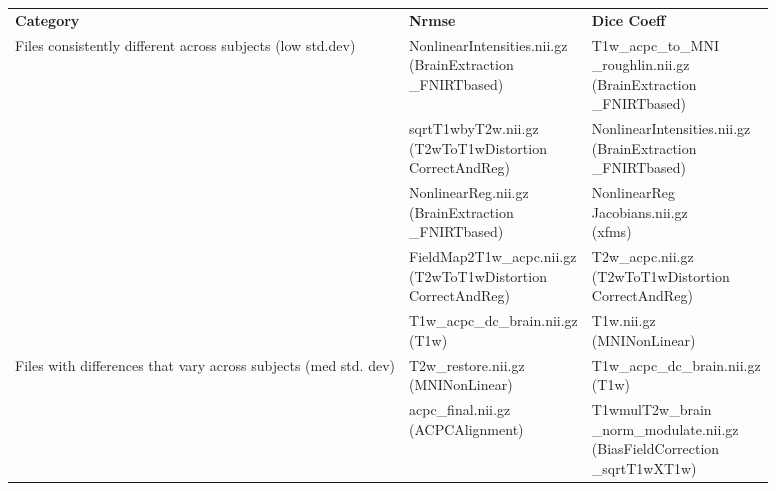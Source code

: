 \iffalse
\begin{center}
\begin{longtable}{|p{}|p{}|p{}|}
\cline{1-3}
\textbf{Category} & \textbf{Nrmse} & \textbf{Dice Coeff} \\\cline{1-3}
\multirow{5}{.2\textwidth}{Files consistently different across subjects (low std.dev)}     & \makecell[l]{NonlinearIntensities.nii.gz \\ (BrainExtraction\\\_FNIRTbased)}  & \makecell[l]{T1w\_acpc\_to\_MNI\\\_roughlin.nii.gz \\ (BrainExtraction\\\_FNIRTbased)} \\\cline{2-3}
& \makecell[l]{sqrtT1wbyT2w.nii.gz \\(T2wToT1wDistortion\\CorrectAndReg)}                   & \makecell[l]{NonlinearIntensities.nii.gz\\(BrainExtraction\\\_FNIRTbased)} \\\cline{2-3}
& \makecell[l]{NonlinearReg.nii.gz\\(BrainExtraction\\\_FNIRTbased)}                        & \makecell[l]{NonlinearReg\\Jacobians.nii.gz\\(xfms)} \\\cline{2-3}
& \makecell[l]{FieldMap2T1w\_acpc.nii.gz\\(T2wToT1wDistortion\\CorrectAndReg)}              & \makecell[l]{T2w\_acpc.nii.gz\\(T2wToT1wDistortion\\CorrectAndReg)} \\\cline{2-3}
& \makecell[l]{T1w\_acpc\_dc\_brain.nii.gz\\(T1w)}                                        & \makecell[l]{T1w.nii.gz\\(MNINonLinear)} \\\cline{1-3}
\multirow{5}{.2\textwidth}{Files with differences that vary across subjects (med std. dev)} & \makecell[l]{T2w\_restore.nii.gz\\(MNINonLinear)}  & \makecell[l]{T1w\_acpc\_dc\_brain.nii.gz\\(T1w)} \\\cline{2-3}
& \makecell[l]{acpc\_final.nii.gz \\(ACPCAlignment)}                       & \makecell[l]{T1wmulT2w\_brain \\ \_norm\_modulate.nii.gz\\(BiasFieldCorrection\\\_sqrtT1wXT1w)} \\\cline{2-3}

\end{longtable}
\end{center}
